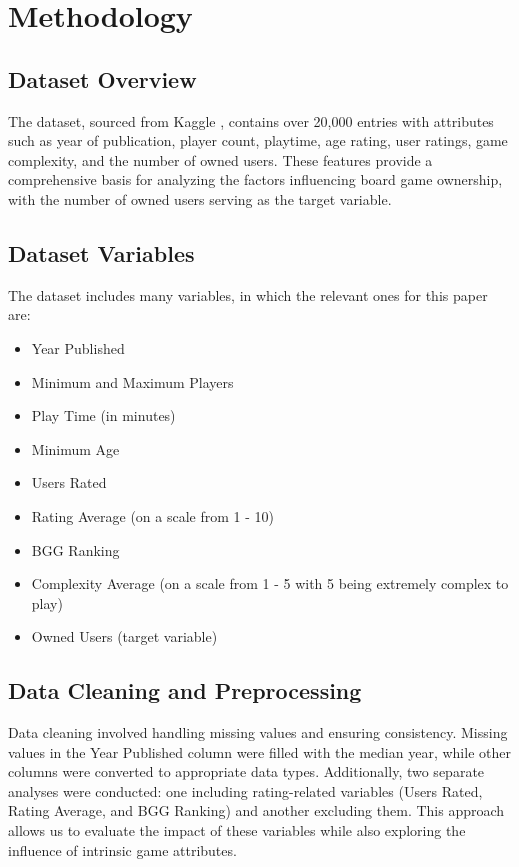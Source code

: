 \documentclass{article}
\begin{document}
\section{Methodology}
\subsection{Dataset Overview}
The dataset, sourced from Kaggle \cite{samarasinghe_dataset}, contains over 20,000 entries with attributes such as year of publication, player count, playtime, age rating, user ratings, game complexity, and the number of owned users. These features provide a comprehensive basis for analyzing the factors influencing board game ownership, with the number of owned users serving as the target variable.

\subsection{Dataset Variables} 
The dataset includes many variables, in which the relevant ones for this paper are:
\begin{itemize}
    \item Year Published
    \item Minimum and Maximum Players
    \item Play Time (in minutes)
    \item Minimum Age
    \item Users Rated
    \item Rating Average (on a scale from 1 - 10)
    \item BGG Ranking
    \item Complexity Average (on a scale from 1 - 5 with 5 being extremely complex to play)
    \item Owned Users (target variable)
\end{itemize}

\subsection{Data Cleaning and Preprocessing}
Data cleaning involved handling missing values and ensuring consistency. Missing values in the Year Published column were filled with the median year, while other columns were converted to appropriate data types. Additionally, two separate analyses were conducted: one including rating-related variables (Users Rated, Rating Average, and BGG Ranking) and another excluding them. This approach allows us to evaluate the impact of these variables while also exploring the influence of intrinsic game attributes.
\end{document}
